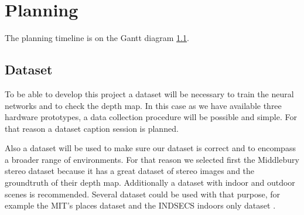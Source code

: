 \documentclass[10pt,a4paper,twocolumn,twoside]{article}
\begin{document}
\section{Planning}
\label{sec:planning}
The planning timeline is on the Gantt diagram \ref{}.

\subsection{Dataset}
To be able to develop this project a dataset will be necessary to train the neural networks and to check the depth map. In this case as we have available three hardware prototypes, a data collection procedure will be possible and simple. For that reason a dataset caption session is planned.

Also a dataset will be used to make sure our dataset is correct and to encompass a broader range of environments. For that reason we selected first the Middlebury stereo dataset \cite{web:middelburyDataset} because it has a great dataset of stereo images and the groundtruth of their depth map. Additionally a dataset with indoor and outdoor scenes is recommended. Several dataset could be used with that purpose, for example the MIT's places dataset \cite{web:mitplaces} and the INDSECS indoors only dataset \cite{web:indecs}.
\end{document}
